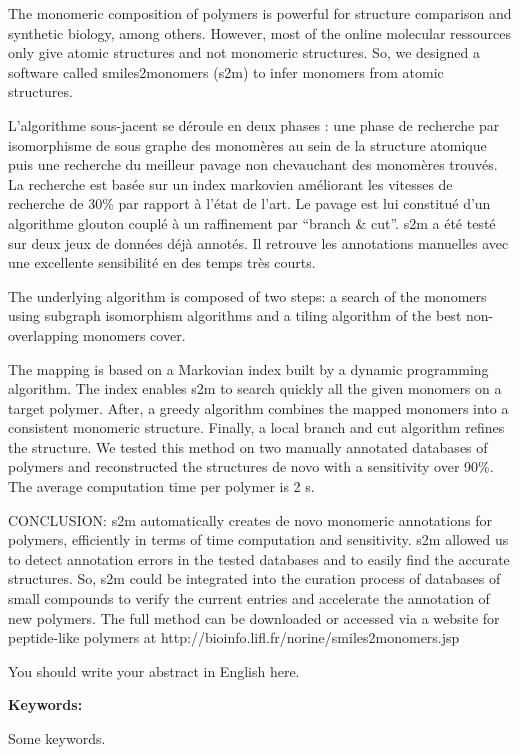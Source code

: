 \documentclass[12pt]{LHSV_thesis}
\begin{document}
The monomeric composition of polymers is powerful for structure comparison and synthetic biology, among others.
However, most of the online molecular ressources only give atomic structures and not monomeric structures.
So, we designed a software called smiles2monomers (s2m) to infer monomers from atomic structures.

L'algorithme sous-jacent se déroule en deux phases : une phase de recherche par isomorphisme de sous graphe des monomères au sein de la structure atomique puis une recherche du meilleur pavage non chevauchant des monomères trouvés.
La recherche est basée sur un index markovien améliorant les vitesses de recherche de 30\% par rapport à l'état de l'art.
Le pavage est lui constitué d'un algorithme glouton couplé à un raffinement par ``branch \& cut''.
s2m a été testé sur deux jeux de données déjà annotés.
Il retrouve les annotations manuelles avec une excellente sensibilité en des temps très courts.

The underlying algorithm is composed of two steps: a search of the monomers using subgraph isomorphism algorithms and a tiling algorithm of the best non-overlapping monomers cover.


The mapping is based on a Markovian index built by a dynamic programming algorithm.
The index enables s2m to search quickly all the given monomers on a target polymer.
After, a greedy algorithm combines the mapped monomers into a consistent monomeric structure.
Finally, a local branch and cut algorithm refines the structure.
We tested this method on two manually annotated databases of polymers and reconstructed the structures de novo with a sensitivity over 90\%.
The average computation time per polymer is 2 s.

CONCLUSION: s2m automatically creates de novo monomeric annotations for polymers, efficiently in terms of time computation and sensitivity.
s2m allowed us to detect annotation errors in the tested databases and to easily find the accurate structures.
So, s2m could be integrated into the curation process of databases of small compounds to verify the current entries and accelerate the annotation of new polymers.
The full method can be downloaded or accessed via a website for peptide-like polymers at http://bioinfo.lifl.fr/norine/smiles2monomers.jsp

You should write your abstract in English here.
\vspace*{28pt}\par
\textbf{Keywords:}\par
Some keywords.
\par
\cleardoublepage
\end{document}
